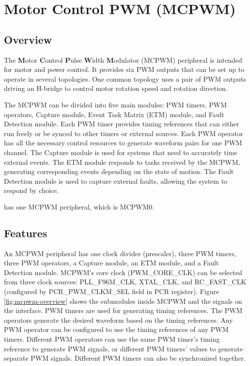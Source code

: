 \documentclass[main\_\_EN.tex]{subfiles}
\begin{document}

\ifglobal
\else
    {\let\clearpage\relax \listoftodos}
    {\let\clearpage\relax \listofdonetodos}
    \tableofcontents
\fi


\hypertarget{mcpwm}{}
\chapter{Motor Control PWM (MCPWM)}
\label{mod:mcpwm}


\section{Overview}

The \textbf{M}otor \textbf{C}ontrol \textbf{P}ulse \textbf{W}idth \textbf{M}odulator (MCPWM) peripheral is intended for motor and power control. It provides six PWM outputs that can be set up to operate in several topologies. One common topology uses a pair of PWM outputs driving an H-bridge to control motor rotation speed and rotation direction.

The MCPWM can be divided into five main modules: PWM timers, PWM operators, Capture module, Event Task Matrix (ETM) module, and Fault Detection module. Each PWM timer provides timing references that can either run freely or be synced to other timers or external sources. Each PWM operator has all the necessary control resources to generate waveform pairs for one PWM channel. The Capture module is used for systems that need to accurately time external events. The ETM module responds to tasks received by the MCPWM, generating corresponding events depending on the state of motion. The Fault Detection module is used to capture external faults, allowing the system to respond by choice.

\chipname{} has one MCPWM peripheral, which is MCPWM0.

\section{Features}
An MCPWM peripheral has one clock divider (prescaler), three PWM timers, three PWM operators, a Capture module, an ETM module, and a Fault Detection module. MCPWM's core clock (PWM\_CORE\_CLK) can be selected from three clock sources: PLL\_F96M\_CLK, XTAL\_CLK, and RC\_FAST\_CLK (configured by PCR\_PWM\_CLKM\_SEL field in PCR register). Figure \ref{fig:mcpwm-overview} shows the submodules inside MCPWM and the signals on the interface. PWM timers are used for generating timing references. The PWM operators generate the desired waveform based on the timing references. Any PWM operator can be configured to use the timing references of any PWM timers. Different PWM operators can use the same PWM timer's timing reference to generate PWM signals, or different PWM timers' values to generate separate PWM signals. Different PWM timers can also be synchronized together.
\end{document}
